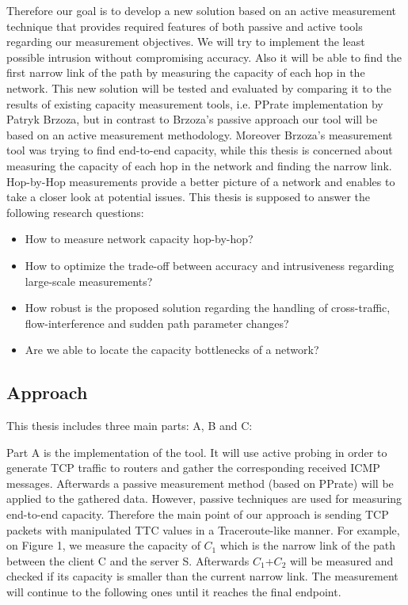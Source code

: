 \documentclass[NET,a4paper,12pt,ngerman]{netforms}
\begin{document}
Therefore our goal is to develop a new solution based on an active measurement technique that provides required features of both passive and active tools regarding our measurement objectives. We will try to implement the least possible intrusion without compromising accuracy. Also it will be able to find the first narrow link of the path by measuring the capacity of each hop in the network.
This new solution will be tested and evaluated by comparing it to the results of existing capacity measurement tools, i.e. PPrate implementation by Patryk Brzoza\cite{BrzozaThesis}, but in contrast to Brzoza's passive approach our tool will be based on an active measurement methodology. Moreover Brzoza's measurement tool was trying to find end-to-end capacity, while this thesis is concerned about measuring the capacity of each hop in the network and finding the narrow link. Hop-by-Hop measurements provide a better picture of a network and enables to take a closer look at potential issues.
This thesis is supposed to answer the following research questions:
\begin{itemize}
    \item How to measure network capacity hop-by-hop?
    \item How to optimize the trade-off between accuracy and intrusiveness regarding large-scale measurements?
    \item How robust is the proposed solution regarding the handling of cross-traffic, flow-interference and sudden path parameter changes?
    \item Are we able to locate the capacity bottlenecks of a network?
\end{itemize}



\subsection*{Approach}
This thesis includes three main parts: A, B and C:

Part A is the implementation of the tool. It will use active probing in order to generate TCP traffic to routers and gather the corresponding received ICMP messages. Afterwards a passive measurement method (based on PPrate\cite{PPrate}) will be applied to the gathered data. However, passive techniques are used for measuring end-to-end capacity. Therefore the main point of our approach is sending TCP packets with manipulated TTC values in a Traceroute-like manner.
For example, on Figure 1, we measure the capacity of $C_1$ which is the narrow link of the path between the client C and the server S. Afterwards $C_1$+$C_2$ will be measured and checked if its capacity is smaller than the current narrow link. The measurement will continue to the following ones until it reaches the final endpoint.
\end{document}
